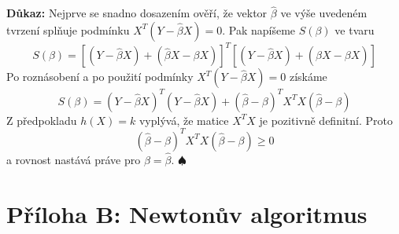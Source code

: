 \documentclass[a4paper]{book}
\begin{document}
\noindent \textbf{Důkaz:} Nejprve se snadno dosazením ověří, že vektor $\hat{\beta}$ ve výše uvedeném tvrzení splňuje podmínku $X^T(Y - \hat{\beta}X) = 0$. Pak napíšeme $S(\beta)$ ve tvaru
\begin{equation*}
S(\beta) = [(Y - \hat{\beta}X) + (\hat{\beta}X - \beta X)]^T[(Y - \hat{\beta}X) + (\hat{\beta}X - \beta X)]
\end{equation*}
Po roznásobení a po použití podmínky $X^T(Y - \hat{\beta}X) = 0$ získáme
\begin{equation*}
S(\beta) = (Y - \hat{\beta}X)^T(Y - \hat{\beta}X) + (\hat{\beta} - \beta)^T X^T X (\hat{\beta} - \beta)
\end{equation*}
Z předpokladu $h(X) = k$ vyplývá, že matice $X^T X$ je pozitivně definitní. Proto
\begin{equation*}
(\hat{\beta} - \beta)^T X^T X (\hat{\beta} - \beta) \ge 0
\end{equation*}
a rovnost nastává práve pro $\beta = \hat{\beta}$. $\spadesuit$

\section{Příloha B: Newtonův algoritmus}
\end{document}
